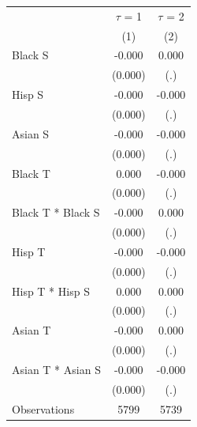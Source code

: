 {
\def\sym#1{\ifmmode^{#1}\else\(^{#1}\)\fi}
\begin{tabular}{l*{2}{c}}
\hline\hline
                    &  $\tau$ = 1         &  $\tau$ = 2         \\
                    &\multicolumn{1}{c}{(1)}         &\multicolumn{1}{c}{(2)}         \\
\hline
Black S             &      -0.000         &       0.000         \\
                    &     (0.000)         &         (.)         \\
[1em]
Hisp S              &      -0.000         &      -0.000         \\
                    &     (0.000)         &         (.)         \\
[1em]
Asian S             &      -0.000         &      -0.000         \\
                    &     (0.000)         &         (.)         \\
[1em]
Black T             &       0.000         &      -0.000         \\
                    &     (0.000)         &         (.)         \\
[1em]
Black T * Black S   &      -0.000         &       0.000         \\
                    &     (0.000)         &         (.)         \\
[1em]
Hisp T              &      -0.000         &      -0.000         \\
                    &     (0.000)         &         (.)         \\
[1em]
Hisp T * Hisp S     &       0.000         &       0.000         \\
                    &     (0.000)         &         (.)         \\
[1em]
Asian T             &      -0.000         &       0.000         \\
                    &     (0.000)         &         (.)         \\
[1em]
Asian T * Asian S   &      -0.000         &      -0.000         \\
                    &     (0.000)         &         (.)         \\
\hline
Observations        &        5799         &        5739         \\
\hline\hline
\end{tabular}
}
